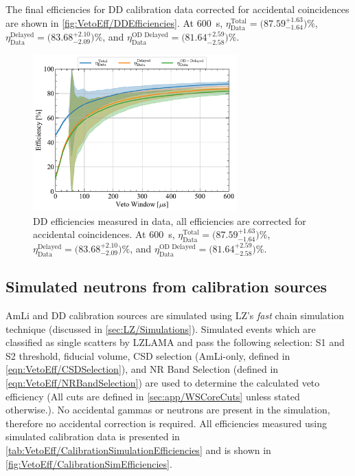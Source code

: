 The final efficiencies for DD calibration data corrected for accidental coincidences are shown in \autoref{fig:VetoEff/DDEfficiencies}. At 600~\textmu s, $\eta^\text{Total}_\text{Data}=\big(87.59^{+1.63}_{-1.64}\big)\%$, $\eta^\text{Delayed}_\text{Data}=\big(83.68^{+2.10}_{-2.09}\big)\%$, and $\eta^\text{OD Delayed}_\text{Data}=\big(81.64^{+2.59}_{-2.58}\big)\%$.

\begin{figure}[ht!]
    \centering
    \includegraphics[width=0.7\textwidth]{figures/VetoEfficiency/DDEfficiencies_Data.pdf}
    \caption{DD efficiencies measured in data, all efficiencies are corrected for accidental coincidences. At 600~\textmu s, $\eta^\text{Total}_\text{Data}=\big(87.59^{+1.63}_{-1.64}\big)\%$, $\eta^\text{Delayed}_\text{Data}=\big(83.68^{+2.10}_{-2.09}\big)\%$, and $\eta^\text{OD Delayed}_\text{Data}=\big(81.64^{+2.59}_{-2.58}\big)\%$.}
    \label{fig:VetoEff/DDEfficiencies}
\end{figure}
\pagebreak
\subsection{Simulated neutrons from calibration sources}
AmLi and DD calibration sources are simulated using LZ's \textit{fast} chain simulation technique (discussed in \autoref{sec:LZ/Simulations}). Simulated events which are classified as single scatters by LZLAMA and pass the following selection: S1 and S2 threshold, fiducial volume, CSD selection (AmLi-only, defined in \autoref{eqn:VetoEff/CSDSelection}), and NR Band Selection (defined in \autoref{eqn:VetoEff/NRBandSelection}) are used to determine the calculated veto efficiency (All cuts are defined in \autoref{sec:app/WSCoreCuts} unless stated otherwise.). 
No accidental gammas or neutrons are present in the simulation, therefore no accidental correction is required. All efficiencies measured using simulated calibration data is presented in \autoref{tab:VetoEff/CalibrationSimulationEfficiencies} and is shown in \autoref{fig:VetoEff/CalibrationSimEfficiencies}.

